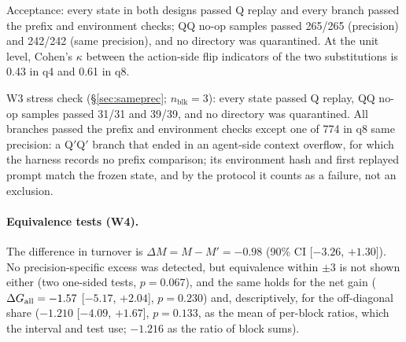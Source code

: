 Acceptance: every state in both designs passed Q replay and every branch passed the prefix and environment checks; QQ no-op samples passed 265/265 (precision) and 242/242 (same precision), and no directory was quarantined. At the unit level, Cohen's $\kappa$ between the action-side flip indicators of the two substitutions is 0.43 in q4 and 0.61 in q8. %

W3 stress check (\S\ref{sec:sameprec}; $n_{\mathrm{blk}}=3$): every state passed Q replay, QQ no-op samples passed 31/31 and 39/39, and no directory was quarantined. All branches passed the prefix and environment checks except one of 774 in q8 same precision: a Q$'$Q$'$ branch that ended in an agent-side context overflow, for which the harness records no prefix comparison; its environment hash and first replayed prompt match the frozen state, and by the protocol it counts as a failure, not an exclusion. %

\paragraph{Equivalence tests (W4).} The difference in turnover is $\Delta M=M-M'=-0.98$\pp{} (90\% CI [$-3.26$, $+1.30]$). No precision-specific excess was detected, but equivalence within $\pm$3\pp{} is not shown either (two one-sided tests, $p=0.067$), and the same holds for the net gain ($\Delta G_{\mathrm{all}}=-1.57$ [$-5.17$, $+2.04$], $p=0.230$) and, descriptively, for the off-diagonal share ($-1.210$ [$-4.09$, $+1.67$], $p=0.133$, as the mean of per-block ratios, which the interval and test use; $-1.216$ as the ratio of block sums). %

